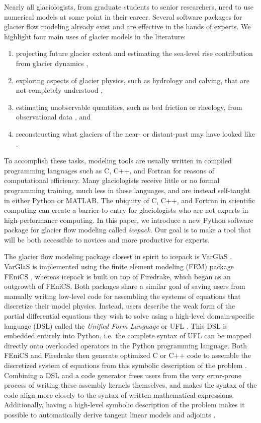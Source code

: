\documentclass[journal abbreviation, manuscript]{copernicus}
\begin{document}
Nearly all glaciologists, from graduate students to senior researchers, need to use numerical models at some point in their career.
Several software packages for glacier flow modeling already exist and are effective in the hands of experts.
We highlight four main uses of glacier models in the literature:
\begin{enumerate}
    \item projecting future glacier extent and estimating the sea-level rise contribution from glacier dynamics \citep{joughin2014marine},
    \item exploring aspects of glacier physics, such as hydrology and calving, that are not completely understood \citep{nick2010physically, werder2013modeling},
    \item estimating unobservable quantities, such as bed friction or rheology, from observational data \citep{vieli2007causes, shapero2016basal}, and
    \item reconstructing what glaciers of the near- or distant-past may have looked like \citep{huybrechts2002sea}.
\end{enumerate}
To accomplish these tasks, modeling tools are usually written in compiled programming languages such as C, C++, and Fortran for reasons of computational efficiency.
Many glaciologists receive little or no formal programming training, much less in these languages, and are instead self-taught in either Python or MATLAB.
The ubiquity of C, C++, and Fortran in scientific computing can create a barrier to entry for glaciologists who are not experts in high-performance computing.
In this paper, we introduce a new Python software package for glacier flow modeling called \emph{icepack}.
Our goal is to make a tool that will be both accessible to novices and more productive for experts.

The glacier flow modeling package closest in spirit to icepack is VarGlaS \citep{brinkerhoff2013data}.
VarGlaS is implemented using the finite element modeling (FEM) package FEniCS \citep{logg2012automated}, whereas icepack is built on top of Firedrake, which began as an outgrowth of FEniCS.
Both packages share a similar goal of saving users from manually writing low-level code for assembling the systems of equations that discretize their model physics.
Instead, users describe the weak form of the partial differential equations they wish to solve using a high-level domain-specific language (DSL) called the \emph{Unified Form Language} or UFL \citep{alnaes2014unified}.
This DSL is embedded entirely into Python, i.e. the complete syntax of UFL can be mapped directly onto overloaded operators in the Python programming language.
Both FEniCS and Firedrake then generate optimized C or C++ code to assemble the discretized system of equations from this symbolic description of the problem \citep{kirby2006compiler, rathgeber2016firedrake}.
Combining a DSL and a code generator frees users from the very error-prone process of writing these assembly kernels themselves, and makes the syntax of the code align more closely to the syntax of written mathematical expressions.
Additionally, having a high-level symbolic description of the problem makes it possible to automatically derive tangent linear models and adjoints \citep{mitusch2019dolfin}.
\end{document}
